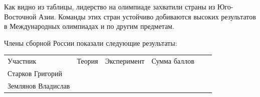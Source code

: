 \begin{multicols*}{2}
    Как видно из таблицы, лидерство на олимпиаде захватили страны из Юго-Восточной Азии. Команды этих стран устойчиво добиваются высоких результатов в Международных олимпиадах и по другим предметам.

    Члены сборной России показали следующие результаты:
    \begin{center}
        \begin{tabular}{p{1.9cm}p{1.3cm}p{2cm}p{1.1cm}p{2cm}c}
             Участник & Теория & Эксперимент & Сумма баллов & \centering{Медаль} & \\
             Старков Григорий & \centering{21,45} & \centering{14,00} & \centering{35,45} & \centering{золото} & \\
             
             Землянов Владислав & \centering{20,60} & \centering{13,65} & \centering{34,75} & \centering{золото} & \\
             
        \end{tabular}
    \end{center}
\end{multicols*}